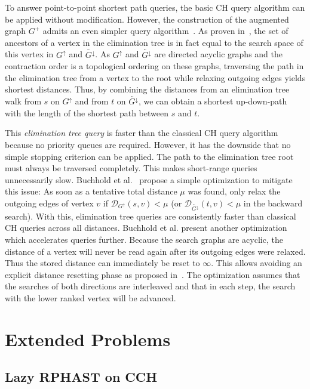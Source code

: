 \documentclass[a4paper, english, cleveref]{lipics-v2021}
\newcommand*{\dist}{\mathcal{D}}
\newcommand*{\gchu}{G^{\uparrow}}
\newcommand*{\rgchd}{\overleftarrow{G^{\downarrow}}}
\begin{document}
To answer point-to-point shortest path queries, the basic CH query algorithm can be applied without modification.
However, the construction of the augmented graph $G^+$ admits an even simpler query algorithm~\cite{DibbeltSW16}.
As proven in~\cite{BauerCRW16}, the set of ancestors of a vertex in the elimination tree is in fact equal to the search space of this vertex in $\gchu$ and $\rgchd$. %
As $\gchu$ and $\rgchd$ are directed acyclic graphs and the contraction order is a topological ordering on these graphs, traversing the path in the elimination tree from a vertex to the root while relaxing outgoing edges yields shortest distances.
Thus, by combining the distances from an elimination tree walk from $s$ on $\gchu$ and from $t$ on $\rgchd$, we can obtain a shortest up-down-path with the length of the shortest path between $s$ and $t$.

This \emph{elimination tree query} is faster than the classical CH query algorithm because no priority queues are required.
However, it has the downside that no simple stopping criterion can be applied.
The path to the elimination tree root must always be traversed completely.
This makes short-range queries unnecessarily slow.
Buchhold et al.~\cite{BuchholdSW19} propose a simple optimization to mitigate this issue:
As soon as a tentative total distance $\mu$ was found, only relax the outgoing edges of vertex $v$ if $\dist_{\gchu}(s,v) < \mu$ (or $\dist_{\rgchd}(t,v) < \mu$ in the backward search).
With this, elimination tree queries are consistently faster than classical CH queries across all distances.
Buchhold et al. present another optimization which accelerates queries further.
Because the search graphs are acyclic, the distance of a vertex will never be read again after its outgoing edges were relaxed.
Thus the stored distance can immediately be reset to $\infty$.
This allows avoiding an explicit distance resetting phase as proposed in~\cite{DibbeltSW16}.
The optimization assumes that the searches of both directions are interleaved and that in each step, the search with the lower ranked vertex will be advanced.

\section{Extended Problems}
\subsection{Lazy RPHAST on CCH}
\end{document}

